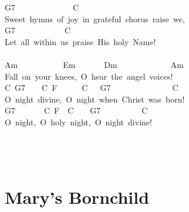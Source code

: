 \documentclass[]{book}
\let\stdsection\section
\renewcommand\section{\clearpage\stdsection}
\begin{document}
\hspace*{0.333em}\hspace*{0.333em}\hspace*{0.333em}\hspace*{0.333em}\hspace*{0.333em}\hspace*{0.333em}G7~~~~~~~~~~~~~~C\\
Sweet~hymns~of~joy~in~grateful~chorus~raise~we,\\
\hspace*{0.333em}\hspace*{0.333em}\hspace*{0.333em}\hspace*{0.333em}G7~~~~~~~~~~~~C\\
Let~all~within~us~praise~His~holy~Name!\\
~\\
Am~~~~~~~~~~~Em~~~~~~~Dm~~~~~~~~~~~~~Am\\
Fall~on~your~knees,~O~hear~the~angel~voices!\\
\hspace*{0.333em}\hspace*{0.333em}C~G7~~~~C~F~~~~~~C~~~G7~~~~~~~~~~~~~~~C\\
O~night~divine,~O~night~when~Christ~was~born!\\
\hspace*{0.333em}\hspace*{0.333em}G7~~~~~~~C~F~~C~~~~G7~~~~~~~~~~C\\
O~night,~O~holy~night,~O~night~divine!\\
~\\
~\\
~\\

\hypertarget{marys-bornchild}{%
\section{Mary's Bornchild}\label{marys-bornchild}}
\end{document}
